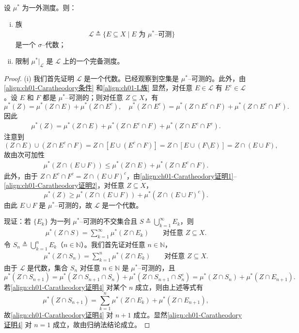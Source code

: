 \documentclass[../../main.tex]{subfiles}%
\begin{document}
\begin{theorem}[Carathéodory]\label{theorem:ch01-Caratheodory}\label{remark:ch01-Caratheodory}
设 $\mu^*$ 为一外测度。则：
\begin{enumerate}[(i)]
\item 族
\begin{align}
\mathcal{L}\triangleq \{E\subseteq X\mid E\text{ 为 }\mu^*\text{--可测}\} \label{align:ch01-L族}
\end{align}
是一个 $\sigma$--代数；
\item 限制 $\mu^*|_{\mathcal{L}}$ 是 $\mathcal{L}$ 上的一个完备测度。
\end{enumerate}
\end{theorem}

\begin{proof}
(i) 我们首先证明 $\mathcal{L}$ 是一个代数。已经观察到空集是 $\mu^*$--可测的。此外，由\eqref{align:ch01-Caratheodory条件} 和\eqref{align:ch01-L族} 显然，对任意 $E\in\mathcal{L}$ 有 $E^c\in\mathcal{L}$。设 $E$ 和 $F$ 都是 $\mu^*$--可测的；则对任意 $Z\subseteq X$，有
\[
\mu^*(Z)=\mu^*(Z\cap E)+\mu^*(Z\cap E^c),\quad
\mu^*(Z\cap E^c)=\mu^*(Z\cap E^c\cap F)+\mu^*(Z\cap E^c\cap F^c).
\]
因此
\begin{align}
\mu^*(Z)=\mu^*(Z\cap E)+\mu^*(Z\cap E^c\cap F)+\mu^*(Z\cap E^c\cap F^c). \label{align:ch01-Caratheodory证明1}
\end{align}
注意到
\[
(Z\cap E)\cup(Z\cap E^c\cap F)=Z\cap[E\cup(E^c\cap F)]=Z\cap[E\cup(F\setminus E)]=Z\cap(E\cup F),
\]
故由次可加性
\begin{align}
\mu^*(Z\cap(E\cup F))\leqslant\mu^*(Z\cap E)+\mu^*(Z\cap E^c\cap F). \label{align:ch01-Caratheodory证明2}
\end{align}
此外，由于 $Z\cap E^c\cap F^c=Z\cap(E\cup F)^c$，由\eqref{align:ch01-Caratheodory证明1}--\eqref{align:ch01-Caratheodory证明2}，对任意 $Z\subseteq X$，
\[
\mu^*(Z)\geqslant\mu^*(Z\cap(E\cup F))+\mu^*(Z\cap(E\cup F)^c).
\]
由此 $E\cup F$ 是 $\mu^*$--可测的，故 $\mathcal{L}$ 是一个代数。

现证：若 $\{E_k\}$ 为一列 $\mu^*$--可测的不交集合且 $S\triangleq \bigcup_{k=1}^\infty E_k$，则
\begin{align}
\mu^*(Z\cap S)=\sum_{k=1}^\infty\mu^*(Z\cap E_k)\qquad\text{对任意 }Z\subseteq X. \label{align:ch01-Caratheodory证明3}
\end{align}
令 $S_n\triangleq \bigcup_{k=1}^n E_k$（$n\in\mathbb{N}$）。我们首先证对任意 $n\in\mathbb{N}$，
\begin{align}
\mu^*(Z\cap S_n)=\sum_{k=1}^n\mu^*(Z\cap E_k)\qquad\text{对任意 }Z\subseteq X. \label{align:ch01-Caratheodory证明4}
\end{align}
由于 $\mathcal{L}$ 是代数，集合 $S_n$ 对任意 $n\in\mathbb{N}$ 是 $\mu^*$--可测的，且
\[
\mu^*(Z\cap S_{n+1})=\mu^*(Z\cap S_{n+1}\cap S_n)+\mu^*(Z\cap S_{n+1}\cap S_n^c)=\mu^*(Z\cap S_n)+\mu^*(Z\cap E_{n+1}).
\]
若\eqref{align:ch01-Caratheodory证明4} 对某个 $n$ 成立，则由上述等式有
\[
\mu^*(Z\cap S_{n+1})=\sum_{k=1}^n\mu^*(Z\cap E_k)+\mu^*(Z\cap E_{n+1}),
\]
故\eqref{align:ch01-Caratheodory证明4} 对 $n+1$ 成立。显然\eqref{align:ch01-Caratheodory证明4} 对 $n=1$ 成立，故由归纳法结论成立。


\end{proof}
\end{document}
